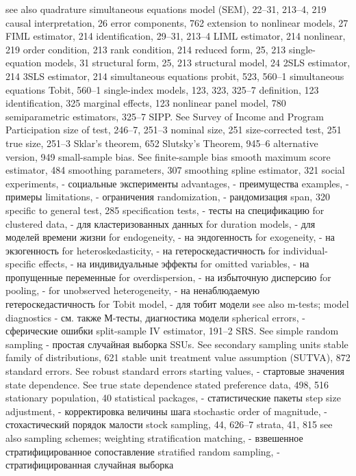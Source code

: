 see also quadrature
simultaneous equations model (SEM), 22–31, 213–4,
219
causal interpretation, 26
error components, 762
extension to nonlinear models, 27 FIML estimator, 214
identification, 29–31, 213–4 LIML estimator, 214 nonlinear, 219
order condition, 213
rank condition, 214 reduced form, 25, 213 single-equation models, 31 structural form, 25, 213 structural model, 24
2SLS estimator, 214
3SLS estimator, 214
simultaneous equations probit, 523, 560–1 simultaneous equations Tobit, 560–1 single-index models, 123, 323, 325–7
definition, 123
identification, 325
marginal effects, 123
nonlinear panel model, 780 semiparametric estimators, 325–7
SIPP. See Survey of Income and Program Participation size of test, 246–7, 251–3
nominal size, 251 size-corrected test, 251 true size, 251–3
Sklar’s theorem, 652 Slutsky’s Theorem, 945–6 alternative version, 949
small-sample bias. See finite-sample bias smooth maximum score estimator, 484 
smoothing parameters, 307
smoothing spline estimator, 321
social experiments, - социальные эксперименты
advantages, - преимущества
examples, - примеры
limitations, - ограничения
randomization, - рандомизация
span, 320
specific to general test, 285 
specification tests, - тесты на спецификацию
for clustered data, - для кластеризованных данных
for duration models, - для моделей времени жизни
for endogeneity, - на эндогенность
for exogeneity, - на экзогенность
for heteroskedasticity, - на гетероскедастичность
for individual-specific effects, - на индивидуальные эффекты
for omitted variables, - на пропущенные переменные
for overdispersion, - на избыточную дисперсию
for pooling, - 
for unobserved heterogeneity, - на ненаблюдаемую гетероскедастичность
for Tobit model, - для тобит модели
see also m-tests; model diagnostics - см. также М-тесты, диагностика модели
spherical errors, - сферические ошибки
split-sample IV estimator, 191–2
SRS. See simple random sampling - простая случайная выборка
SSUs. See secondary sampling units
stable family of distributions, 621
stable unit treatment value assumption (SUTVA), 872 standard errors. See robust standard errors
starting values, - стартовые значения
state dependence. See true state dependence stated preference data, 498, 516
stationary population, 40
statistical packages, - статистические пакеты
step size adjustment, - корректировка величины шага
stochastic order of magnitude, - стохастический порядок малости
stock sampling, 44, 626–7
strata, 41, 815
see also sampling schemes; 
weighting stratification matching, - взвешенное стратифицированное сопоставление
stratified random sampling, - стратифицированная случайная выборка
